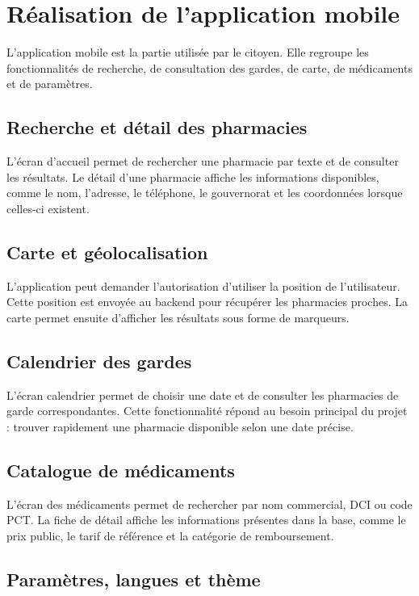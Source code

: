 \section{Réalisation de l'application mobile}

L'application mobile est la partie utilisée par le citoyen. Elle regroupe les fonctionnalités de recherche,
de consultation des gardes, de carte, de médicaments et de paramètres.

\subsection{Recherche et détail des pharmacies}

L'écran d'accueil permet de rechercher une pharmacie par texte et de consulter les résultats. Le détail
d'une pharmacie affiche les informations disponibles, comme le nom, l'adresse, le téléphone, le
gouvernorat et les coordonnées lorsque celles-ci existent.

\subsection{Carte et géolocalisation}

L'application peut demander l'autorisation d'utiliser la position de l'utilisateur. Cette position est envoyée
au backend pour récupérer les pharmacies proches. La carte permet ensuite d'afficher les résultats sous
forme de marqueurs.

\subsection{Calendrier des gardes}

L'écran calendrier permet de choisir une date et de consulter les pharmacies de garde correspondantes.
Cette fonctionnalité répond au besoin principal du projet : trouver rapidement une pharmacie disponible
selon une date précise.

\subsection{Catalogue de médicaments}

L'écran des médicaments permet de rechercher par nom commercial, DCI ou code PCT. La fiche de détail
affiche les informations présentes dans la base, comme le prix public, le tarif de référence et la catégorie
de remboursement.

\subsection{Paramètres, langues et thème}

